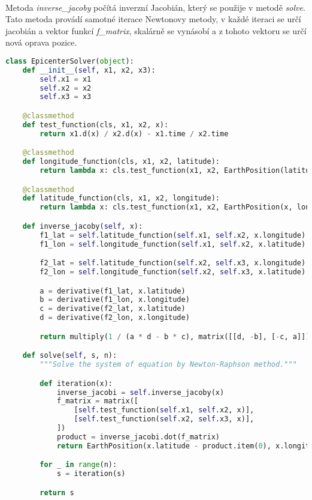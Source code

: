 \documentclass{article}
\begin{document}
    \paragraph{} Metoda \textit{inverse\_jacoby} počítá inverzní Jacobián, který se použije
        v metodě \textit{solve}. Tato metoda provádí samotné iterace Newtonovy metody, v každé
        iteraci se určí jacobián a vektor funkcí \textit{f\_matrix}, skalárně se vynásobí a z tohoto
        vektoru se určí nová oprava pozice.

    \begin{lstlisting}[language=Python]
class EpicenterSolver(object):
    def __init__(self, x1, x2, x3):
        self.x1 = x1
        self.x2 = x2
        self.x3 = x3

    @classmethod
    def test_function(cls, x1, x2, x):
        return x1.d(x) / x2.d(x) - x1.time / x2.time

    @classmethod
    def longitude_function(cls, x1, x2, latitude):
        return lambda x: cls.test_function(x1, x2, EarthPosition(latitude, x))

    @classmethod
    def latitude_function(cls, x1, x2, longitude):
        return lambda x: cls.test_function(x1, x2, EarthPosition(x, longitude))

    def inverse_jacoby(self, x):
        f1_lat = self.latitude_function(self.x1, self.x2, x.longitude)
        f1_lon = self.longitude_function(self.x1, self.x2, x.latitude)

        f2_lat = self.latitude_function(self.x2, self.x3, x.longitude)
        f2_lon = self.longitude_function(self.x2, self.x3, x.latitude)

        a = derivative(f1_lat, x.latitude)
        b = derivative(f1_lon, x.longitude)
        c = derivative(f2_lat, x.latitude)
        d = derivative(f2_lon, x.longitude)

        return multiply(1 / (a * d - b * c), matrix([[d, -b], [-c, a]]))

    def solve(self, s, n):
        """Solve the system of equation by Newton-Raphson method."""

        def iteration(x):
            inverse_jacobi = self.inverse_jacoby(x)
            f_matrix = matrix([
                [self.test_function(self.x1, self.x2, x)],
                [self.test_function(self.x2, self.x3, x)],
            ])
            product = inverse_jacobi.dot(f_matrix)
            return EarthPosition(x.latitude - product.item(0), x.longitude - product.item(1))

        for _ in range(n):
            s = iteration(s)

        return s\end{lstlisting}
\end{document}
